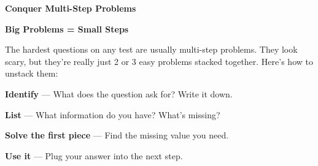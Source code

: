 \clearpage
\thispagestyle{empty}
{\sffamily

\begin{center}
{\fontsize{22}{26}\selectfont\bfseries\color{funRed} \faCubes\hspace{3mm}Conquer Multi-Step Problems\hspace{3mm}\faCubes}

\vspace{2mm}
{\color{funGray}\hrulefill}
\end{center}

\vspace{3mm}

\begin{tcolorbox}[
    enhanced,
    colback=funRedLight,
    colframe=funRed!40,
    arc=10pt,
    boxrule=1.5pt,
    left=6mm, right=6mm, top=5mm, bottom=5mm,
]
{\large\bfseries\color{funRedDark} \faProjectDiagram\hspace{2mm}Big Problems = Small Steps}

\vspace{2mm}

The hardest questions on any test are usually multi-step problems. They look scary, but they're really just 2 or 3 easy problems stacked together. Here's how to unstack them:

\vspace{3mm}

\textcolor{funRed}{\faArrowDown}\hspace{2mm}\textbf{Identify} — What does the question ask for? Write it down.

\vspace{2mm}

\textcolor{funRed}{\faArrowDown}\hspace{2mm}\textbf{List} — What information do you have? What's missing?

\vspace{2mm}

\textcolor{funRed}{\faArrowDown}\hspace{2mm}\textbf{Solve the first piece} — Find the missing value you need.

\vspace{2mm}

\textcolor{funRed}{\faArrowDown}\hspace{2mm}\textbf{Use it} — Plug your answer into the next step.

\vspace{2mm}


\end{tcolorbox}}
